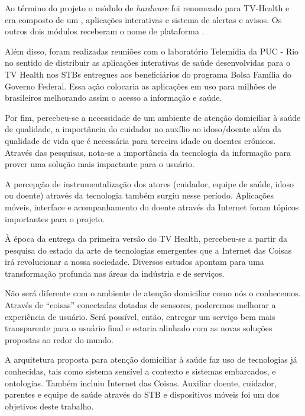 Ao término do projeto \nextsaude[] o módulo de \textit{hardware} foi renomeado para
TV-Health e era composto de um \stb[], aplicações interativas e sistema de alertas 
e avisos. Os outros dois módulos receberam o nome de plataforma \nextsaude.

Além disso, foram realizadas reuniões com o laboratório Telemídia da PUC - Rio
no sentido de distribuir as aplicações interativas de saúde desenvolvidas para o TV
Health nos STBs entregues aos beneficiários do programa Bolsa Família do Governo Federal.
Essa ação colocaria as aplicações em uso para milhões de brasileiros
melhorando assim o acesso a informação e saúde.



Por fim, percebeu-se a necessidade de um ambiente de atenção domiciliar à saúde
de qualidade, a importância do cuidador no auxílio ao idoso/doente além da
qualidade de vida que é necessária para terceira idade ou doentes crônicos.
Através das pesquisas, nota-se a importância da tecnologia da
informação para prover uma solução mais impactante para o usuário. 

A percepção de instrumentalização dos atores (cuidador, equipe de saúde, idoso
ou doente) através da tecnologia também surgiu nesse período. Aplicações
móveis, interface \web[] e acompanhamento do doente através da Internet foram
tópicos importantes para o projeto.

À época da entrega da primeira versão do TV Health, percebeu-se a partir da
pesquisa do estado da arte de tecnologias emergentes que a Internet das Coisas
irá revolucionar a nossa sociedade. Diversos estudos apontam para uma transformação
profunda nas áreas da indústria e de serviços.

Não será diferente com o ambiente de atenção domiciliar como nós o conhecemos. Através
de ``coisas'' conectadas dotadas de sensores, poderemos melhorar a experiência
de usuário. Será possível, então, entregar um serviço bem mais transparente
para o usuário final e estaria alinhado com as novas soluções propostas ao
redor do mundo.

A arquitetura proposta para atenção domiciliar à saúde faz uso de tecnologias
já conhecidas, tais como sistema sensível a contexto e sistemas embarcados, e
ontologias. Também incluiu Internet das Coisas. Auxiliar doente, cuidador,
parentes e equipe de saúde através do STB e dispositivos móveis foi um dos
objetivos deste trabalho. 

